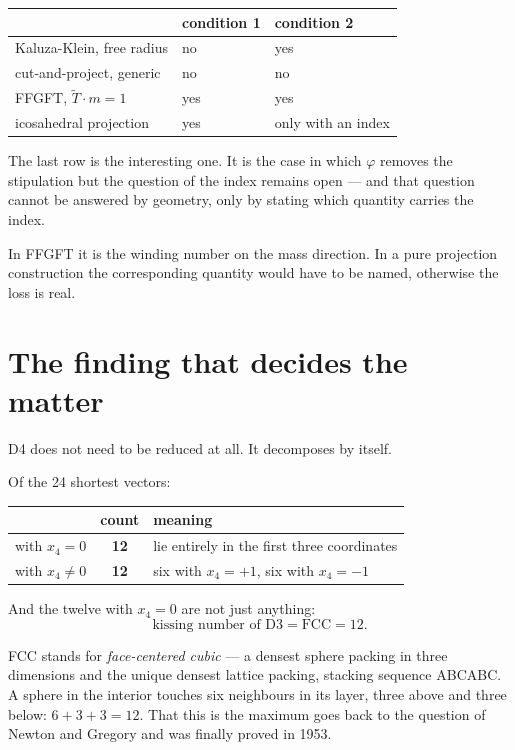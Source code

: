 \begin{center}
\begin{tabular}{lll}
\toprule
 & condition 1 & condition 2 \\
\midrule
Kaluza-Klein, free radius & no & yes \\
cut-and-project, generic & no & no \\
FFGFT, $\tilde T \cdot m = 1$ & yes & yes \\
icosahedral projection & yes & only with an index \\
\bottomrule
\end{tabular}
\end{center}

The last row is the interesting one. It is the case in which $\varphi$
removes the stipulation but the question of the index remains open ---
and that question cannot be answered by geometry, only by stating which
quantity carries the index.

In FFGFT it is the winding number on the mass direction. In a pure
projection construction the corresponding quantity would have to be
named, otherwise the loss is real.

\chapter{The finding that decides the matter}

D4 does not need to be reduced at all. It decomposes by itself.

Of the 24 shortest vectors:
\begin{center}
\begin{tabular}{lcl}
\toprule
 & count & meaning \\
\midrule
with $x_4 = 0$ & \textbf{12} & lie entirely in the first three coordinates \\
with $x_4 \neq 0$ & \textbf{12} & six with $x_4 = +1$, six with $x_4 = -1$ \\
\bottomrule
\end{tabular}
\end{center}

And the twelve with $x_4 = 0$ are not just anything:
\[
  \text{kissing number of D3} = \text{FCC} = 12 .
\]

FCC stands for \emph{face-centered cubic} --- a densest sphere
packing in three dimensions and the unique densest lattice packing, stacking sequence ABCABC. A sphere in the
interior touches six neighbours in its layer, three above and three
below: $6 + 3 + 3 = 12$. That this is the maximum goes back to the
question of Newton and Gregory and was finally proved in 1953.

